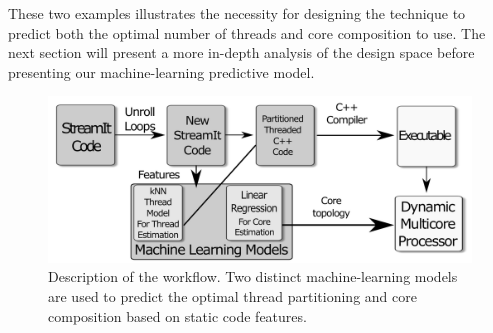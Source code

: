 These two examples illustrates the necessity for designing the technique to predict both the optimal number of threads and core composition to use.
The next section will present a more in-depth analysis of the design space before presenting our machine-learning predictive model.


\begin{figure}[t]
    \centering
    \includegraphics[width=1\textwidth]{streamit-paper/graphics/explanation3.pdf}
    \caption{Description of the workflow.
    Two distinct machine-learning models are used to predict the optimal thread partitioning and core composition based on static code features.}
    \label{fig:overview}
\end{figure}
